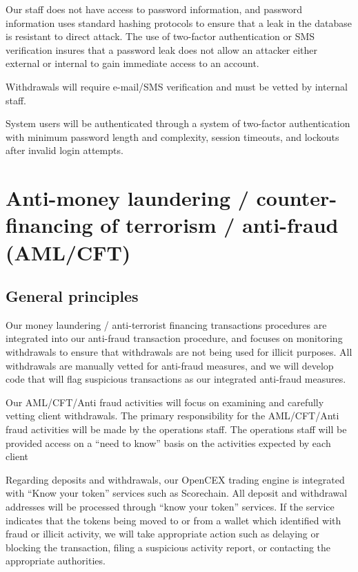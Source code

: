 Our staff does not have access to password information, and password
information uses standard hashing protocols to ensure that a leak in
the database is resistant to direct attack.  The use of two-factor
authentication or SMS verification insures that a password leak does
not allow an attacker either external or internal to gain immediate
access to an account.

Withdrawals will require e-mail/SMS verification and must be vetted by
internal staff.

System users will be authenticated through a system of two-factor
authentication with minimum password length and complexity, session
timeouts, and lockouts after invalid login attempts.

\section{Anti-money laundering / counter-financing of terrorism /
  anti-fraud (AML/CFT)}

\subsection{General principles}

Our money laundering / anti-terrorist financing transactions
procedures are integrated into our anti-fraud transaction procedure,
and focuses on monitoring withdrawals to ensure that withdrawals are
not being used for illicit purposes.  All withdrawals are manually
vetted for anti-fraud measures, and we will develop code that will
flag suspicious transactions as our integrated anti-fraud measures.

Our AML/CFT/Anti fraud activities will focus on examining and
carefully vetting client withdrawals.  The primary responsibility for
the AML/CFT/Anti fraud activities will be made by the operations
staff.  The operations staff will be provided access on a ``need to
know'' basis on the activities expected by each client

Regarding deposits and withdrawals, our OpenCEX trading engine
is integrated with ``Know your token'' services such as Scorechain.
All deposit and withdrawal addresses will be processed through ``know
your token'' services.  If the service indicates that
the tokens being moved to or from a wallet which identified with fraud
or illicit activity, we will take appropriate action such as
delaying or blocking the transaction, filing a suspicious activity
report, or contacting the appropriate authorities.

